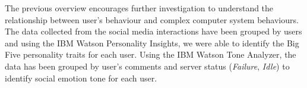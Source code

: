 \documentclass[graybox]{svmult}
\begin{document}
{The previous overview encourages further investigation to understand
the relationship between user's behaviour and complex computer system
behaviours. The data collected from the social media interactions have
been grouped by users and using the IBM Watson Personality Insights,
we were able to identify the Big Five personality traits for each
user. Using the IBM Watson Tone Analyzer, the data has been grouped by
user's comments and server status ({\emph{Failure}}, {\emph{Idle}}) to
identify social emotion tone for each user. 


}
\end{document}
